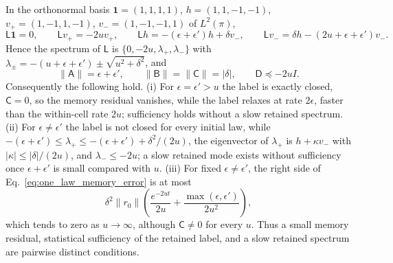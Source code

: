 \begin{proposition}\label{prop:sp_memory_conditions}
In the orthonormal basis $\mathbf 1=(1,1,1,1)$, $h=(1,1,-1,-1)$, $v_+=(1,-1,1,-1)$, $v_-=(1,-1,-1,1)$ of $L^2(\pi)$,
\begin{equation}
\mathsf L\mathbf 1=0,\qquad
\mathsf Lv_+=-2uv_+,\qquad
\mathsf Lh=-(\epsilon+\epsilon')h+\delta v_-,\qquad
\mathsf Lv_-=\delta h-(2u+\epsilon+\epsilon')v_-.
\label{eq:sp_four_state_action}
\end{equation}
Hence the spectrum of $\mathsf L$ is $\{0,-2u,\lambda_+,\lambda_-\}$ with $\lambda_\pm=-(u+\epsilon+\epsilon')\pm\sqrt{u^2+\delta^2}$, and
\begin{equation}
\|\mathsf A\|=\epsilon+\epsilon',\qquad
\|\mathsf B\|=\|\mathsf C\|=|\delta|,\qquad
\mathsf D\preceq-2uI.
\label{eq:sp_four_state_blocks}
\end{equation}
Consequently the following hold.
(i) For $\epsilon=\epsilon'>u$ the label is exactly closed, $\mathsf C=0$, so the memory residual vanishes, while the label relaxes at rate $2\epsilon$, faster than the within-cell rate $2u$; sufficiency holds without a slow retained spectrum.
(ii) For $\epsilon\neq\epsilon'$ the label is not closed for every initial law, while $-(\epsilon+\epsilon')\leq\lambda_+\leq-(\epsilon+\epsilon')+\delta^2/(2u)$, the eigenvector of $\lambda_+$ is $h+\kappa v_-$ with $|\kappa|\leq|\delta|/(2u)$, and $\lambda_-\leq-2u$; a slow retained mode exists without sufficiency once $\epsilon+\epsilon'$ is small compared with $u$.
(iii) For fixed $\epsilon\neq\epsilon'$, the right side of Eq.~\eqref{eq:one_law_memory_error} is at most
\begin{equation}
\delta^2\|r_0\|\left(\frac{e^{-2ut}}{2u}+\frac{\max(\epsilon,\epsilon')}{2u^2}\right),
\label{eq:sp_four_state_residual}
\end{equation}
which tends to zero as $u\to\infty$, although $\mathsf C\neq0$ for every $u$.
Thus a small memory residual, statistical sufficiency of the retained label, and a slow retained spectrum are pairwise distinct conditions.
\end{proposition}
